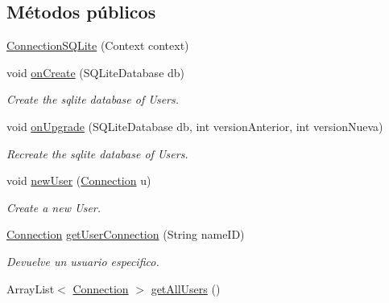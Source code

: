 \subsection*{Métodos públicos}
\begin{DoxyCompactItemize}
\item 
\hyperlink{classes_1_1ucm_1_1tfg_1_1controlremotolinux_1_1client_1_1model_1_1sql_1_1ConnectionSQLite_a4dc4c2ff2209a11e9c36fcb1574307cb}{Connection\-S\-Q\-Lite} (Context context)
\item 
void \hyperlink{classes_1_1ucm_1_1tfg_1_1controlremotolinux_1_1client_1_1model_1_1sql_1_1ConnectionSQLite_a441e7611dbaa45c4051f2d0656de3233}{on\-Create} (S\-Q\-Lite\-Database db)
\begin{DoxyCompactList}\small\item\em Create the sqlite database of Users. \end{DoxyCompactList}\item 
void \hyperlink{classes_1_1ucm_1_1tfg_1_1controlremotolinux_1_1client_1_1model_1_1sql_1_1ConnectionSQLite_ad1d03604bc6e793c839513ed56da1f08}{on\-Upgrade} (S\-Q\-Lite\-Database db, int version\-Anterior, int version\-Nueva)
\begin{DoxyCompactList}\small\item\em Recreate the sqlite database of Users. \end{DoxyCompactList}\item 
void \hyperlink{classes_1_1ucm_1_1tfg_1_1controlremotolinux_1_1client_1_1model_1_1sql_1_1ConnectionSQLite_a6a680a3ac50262a0c6c464fe89fdab9d}{new\-User} (\hyperlink{classes_1_1ucm_1_1tfg_1_1controlremotolinux_1_1client_1_1model_1_1sql_1_1Connection}{Connection} u)
\begin{DoxyCompactList}\small\item\em Create a new User. \end{DoxyCompactList}\item 
\hyperlink{classes_1_1ucm_1_1tfg_1_1controlremotolinux_1_1client_1_1model_1_1sql_1_1Connection}{Connection} \hyperlink{classes_1_1ucm_1_1tfg_1_1controlremotolinux_1_1client_1_1model_1_1sql_1_1ConnectionSQLite_ac6a36ab5e85a1b578e1861ad0b040092}{get\-User\-Connection} (String name\-I\-D)
\begin{DoxyCompactList}\small\item\em Devuelve un usuario especifico. \end{DoxyCompactList}\item 
Array\-List$<$ \hyperlink{classes_1_1ucm_1_1tfg_1_1controlremotolinux_1_1client_1_1model_1_1sql_1_1Connection}{Connection} $>$ \hyperlink{classes_1_1ucm_1_1tfg_1_1controlremotolinux_1_1client_1_1model_1_1sql_1_1ConnectionSQLite_ad31166c02a019e76ae6d927aa4bdf57f}{get\-All\-Users} ()

\end{DoxyCompactItemize}
